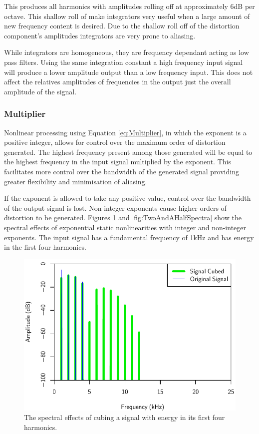 			This produces all harmonics with amplitudes rolling off at approximately 6dB per octave. This
			shallow roll of make integrators very useful when a large amount of new frequency content is
			desired. Due to the shallow roll off of the distortion component's amplitudes integrators are very
			prone to aliasing.

			While integrators are homogeneous, they are frequency dependant acting as low pass filters. Using
			the same integration constant a high frequency input signal will produce a lower amplitude output
			than a low frequency input. This does not affect the relatives amplitudes of frequencies in the
			output just the overall amplitude of the signal.

		\subsubsection*{Multiplier}
			Nonlinear processing using Equation \ref{eq:Multiplier}, in which the exponent is a positive
			integer, allows for control over the maximum order of distortion generated. The highest frequency
			present among those generated will be equal to the highest frequency in the input signal multiplied
			by the exponent. This facilitates more control over the bandwidth of the generated signal providing
			greater flexibility and minimisation of aliasing.

			If the exponent is allowed to take any positive value, control over the bandwidth of the output
			signal is lost. Non integer exponents cause higher orders of distortion to be generated. Figures
			\ref{fig:CubedSpectra} and \ref{fig:TwoAndAHalfSpectra} show the spectral effects of exponential
			static nonlinearities with integer and non-integer exponents. The input signal has a fundamental
			frequency of 1kHz and has energy in the first four harmonics.

			\begin{figure}[h!]
				\centering
				\includegraphics{chapter5/Images/CubedSpectra.pdf}
				\caption{The spectral effects of cubing a signal with energy in its first four harmonics.}
				\label{fig:CubedSpectra}
			\end{figure}

